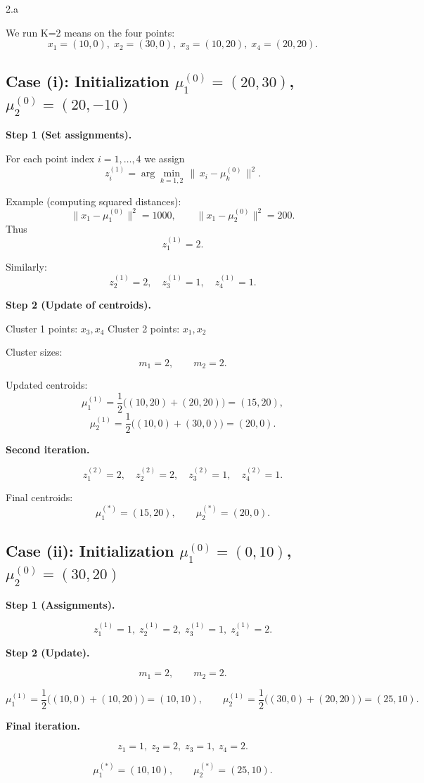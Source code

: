 \LARGE
2.a
\normalsize

\begin{answer}

We run K=2 means on the four points:
\[
x_1=(10,0),\;
x_2=(30,0),\;
x_3=(10,20),\;
x_4=(20,20).
\]

\subsection*{Case (i): Initialization $\mu_1^{(0)} = (20,30)$, $\mu_2^{(0)} = (20,-10)$}

\textbf{Step 1 (Set assignments).}

For each point index $i = 1,\ldots,4$ we assign
\[
z_i^{(1)}
=
\arg\min_{k=1,2}
\,\bigl\|\, x_i - \mu_k^{(0)} \,\bigr\|^2.
\]

Example (computing squared distances):
\[
\|x_1-\mu_1^{(0)}\|^2 = 1000,
\qquad
\|x_1-\mu_2^{(0)}\|^2 = 200.
\]
Thus
\[
z_1^{(1)} = 2.
\]

Similarly:
\[
z_2^{(1)} = 2,\quad
z_3^{(1)} = 1,\quad
z_4^{(1)} = 1.
\]

\textbf{Step 2 (Update of centroids).}

Cluster 1 points: $x_3, x_4$  
Cluster 2 points: $x_1, x_2$

Cluster sizes:
\[
m_1 = 2,\qquad m_2 = 2.
\]

Updated centroids:
\[
\mu_1^{(1)}
=
\frac{1}{2}\bigl((10,20)+(20,20)\bigr)
=
(15,20),
\]
\[
\mu_2^{(1)}
=
\frac{1}{2}\bigl((10,0)+(30,0)\bigr)
=
(20,0).
\]

\textbf{Second iteration.}

\[
z_1^{(2)} = 2,\quad
z_2^{(2)} = 2,\quad
z_3^{(2)} = 1,\quad
z_4^{(2)} = 1.
\]

Final centroids:
\[
\mu_1^{(*)} = (15,20),\qquad
\mu_2^{(*)} = (20,0).
\]


\subsection*{Case (ii): Initialization $\mu_1^{(0)} = (0,10)$, $\mu_2^{(0)} = (30,20)$}

\textbf{Step 1 (Assignments).}

\[
z_1^{(1)} = 1,\;
z_2^{(1)} = 2,\;
z_3^{(1)} = 1,\;
z_4^{(1)} = 2.
\]

\textbf{Step 2 (Update).}

\[
m_1 = 2,\qquad m_2 = 2.
\]

\[
\mu_1^{(1)}=\frac{1}{2}\bigl((10,0)+(10,20)\bigr)=(10,10),
\qquad
\mu_2^{(1)}=\frac{1}{2}\bigl((30,0)+(20,20)\bigr)=(25,10).
\]

\textbf{Final iteration.}

\[
z_1=1,\;
z_2=2,\;
z_3=1,\;
z_4=2.
\]

\[
\mu_1^{(*)}=(10,10),
\qquad
\mu_2^{(*)}=(25,10).
\]


\end{answer}
\clearpage

